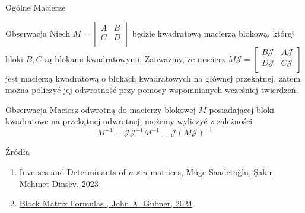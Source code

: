 \documentclass{beamer}
\begin{document}
\begin{frame}{Ogólne Macierze}
    \begin{block}{Obserwacja}
        Niech $M = \begin{bmatrix}
            A & B \\ C & D \\
        \end{bmatrix}$ będzie kwadratową macierzą blokową, której bloki $B, C$ są blokami kwadratowymi. 
        Zauważmy, że macierz $M\mathcal{J} = \begin{bmatrix}
            B\mathcal{J} & A\mathcal{J} \\ D\mathcal{J} & C\mathcal{J} \\
        \end{bmatrix}$ jest macierzą kwadratową o blokach kwadratowych na głównej przekątnej, zatem można policzyć jej odwrotność 
        przy pomocy wspomnianych wcześniej twierdzeń. 
    \end{block}
    \begin{block}{Obserwacja}
        Macierz odwrotną do macierzy blokowej $M$ posiadającej bloki kwadratowe na przekątnej odwrotnej, możemy wyliczyć z zależności
        $$M^{-1} = \mathcal{J}\mathcal{J}^{-1} M^{-1} = \mathcal{J} (M\mathcal{J})^{-1}$$
    \end{block}
\end{frame}
\begin{frame}{Źródła}
    \begin{enumerate}
        \item \href{https://www.mdpi.com/2227-7390/11/17/3784}{Inverses and Determinants of $n \times n$ matrices, Müge Saadetoğlu, Şakir Mehmet Dinsev, 2023}
        \item \href{https://gubner.ece.wisc.edu/notes/BlockMatrixFormulas.pdf}{Block Matrix Formulas , John A. Gubner, 2024}
    \end{enumerate}
\end{frame}
\end{document}
